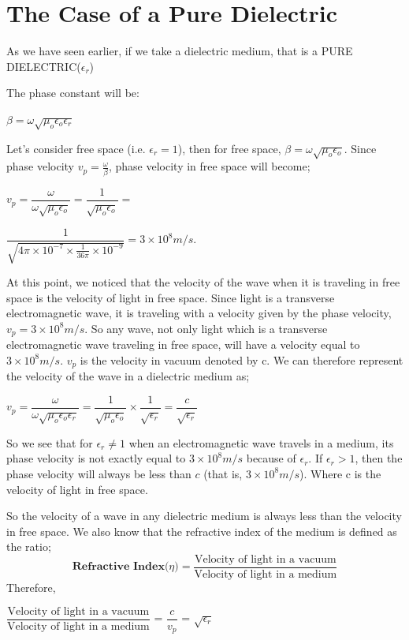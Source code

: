 \section{\textbf{The Case of a Pure Dielectric}}

As we have seen earlier, if we take a dielectric medium, that is a PURE DIELECTRIC($\epsilon_{r}$)

The phase constant will be:

\begin{center}
$\beta=\omega\sqrt{\mu_{o}\epsilon_{o}\epsilon_{r}}$ 
\end{center}

Let's consider free space (i.e. $\epsilon_{r}=1 $), then for free space, $\beta=\omega\sqrt{\mu_{o}\epsilon_{o}}$.
Since phase velocity $v_p=\frac{\omega}{\beta}$, phase velocity in free space will become;

$v_p=\dfrac{\omega}{\omega\sqrt{\mu_{o}\epsilon_{o}}}=\dfrac{1}{\sqrt{\mu_{o}\epsilon_{o}}}=$ 

$\dfrac{1}{\sqrt{4\pi\times 10^{-7}\times \frac{1}{36\pi}\times 10^{-9}}}=3\times 10^{8}m/s.$

At this point, we noticed that the velocity of the wave when it is traveling in free space is the velocity of light in free space. Since light is a transverse electromagnetic wave, it is traveling with a velocity given by the phase velocity, $v_{p} = 3\times 10^{8}m/s$. So any wave, not only light which is a transverse electromagnetic wave traveling in free space, will have a velocity equal to $3\times 10^{8}m/s$. $v_p$ is the velocity in vacuum denoted by c.
We can therefore represent the velocity of the wave in a dielectric medium as;

$v_p=\dfrac{\omega}{\omega\sqrt{\mu_{o}\epsilon_{o}\epsilon_{r}}}=\dfrac{1}{\sqrt{\mu_{o}\epsilon_{o}}}\times \dfrac{1}{\sqrt{\epsilon_{r}}}=\dfrac{c}{\sqrt{\epsilon_{r}}}$

So we see that for $\epsilon_{r}\neq 1$ when an electromagnetic wave travels in a medium, its phase velocity is not exactly equal to  $3\times 10^{8}m/s$ because of $\epsilon_{r}$. If $\epsilon_{r}>1$, then the phase velocity will always be less than $c$ (that is, $3\times 10^{8}m/s$). Where c is the velocity of light in free space.

So the velocity of a wave in any dielectric medium is always less than the velocity in free space. We also know that the refractive index of the medium is defined as the ratio;
\begin{equation}
\textbf{Refractive Index($\eta$)} =	\dfrac{\text{Velocity of light in a vacuum}}{\text{Velocity of light in a medium}}
\end{equation}
Therefore,
\begin{center}
$\dfrac{\text{Velocity of light in a vacuum}}{\text{Velocity of light in a medium}}$	
= $\dfrac{c}{v_{p}}$ = $\sqrt{\epsilon_{r}}$  
\end{center}

